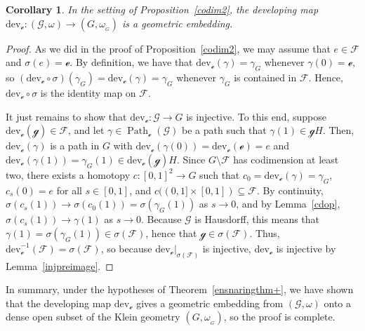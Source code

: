 \documentclass[10pt,a4paper]{amsart}
\numberwithin{equation}{section}
\newtheorem{Corollary}[Theorem]{Corollary}
\theoremstyle{definition}
\DeclareMathOperator{\Path}{Path}
\newcommand{\MC}[1]{\omega_{{}_{#1}}}
\begin{document}
\begin{Corollary}\label{codim2cor} In the setting of Proposition~{\rm \ref{codim2}}, the developing map $\mathrm{dev}_\mathscr{e}\colon (\mathscr{G},\omega)\to(G,\MC{G})$ is a geometric embedding.
\end{Corollary}
\begin{proof}As we did in the proof of Proposition~\ref{codim2}, we may assume that $e\in\mathscr{F}$ and $\sigma(e)=\mathscr{e}$. By definition, we have that $\mathrm{dev}_\mathscr{e}(\gamma)=\gamma_G$ whenever $\gamma(0)=\mathscr{e}$, so $(\mathrm{dev}_\mathscr{e}\circ\sigma)(\gamma_G)=\mathrm{dev}_\mathscr{e}(\gamma)=\gamma_G$ whenever $\gamma_G$ is contained in $\mathscr{F}$. Hence, $\mathrm{dev}_\mathscr{e}\circ\sigma$ is the identity map on $\mathscr{F}$.

It just remains to show that $\mathrm{dev}_\mathscr{e}\colon \mathscr{G}\to G$ is injective. To this end, suppose $\mathrm{dev}_\mathscr{e}(\mathscr{g})\in\mathscr{F}$, and let $\gamma\in\Path_\mathscr{e}(\mathscr{G})$ be a path such that $\gamma(1)\in\mathscr{g}H$. Then, $\mathrm{dev}_\mathscr{e}(\gamma)$ is a path in $G$ with $\mathrm{dev}_\mathscr{e}(\gamma(0))=\mathrm{dev}_\mathscr{e}(\mathscr{e})=e$ and $\mathrm{dev}_\mathscr{e}(\gamma(1))=\gamma_G(1)\in\mathrm{dev}_\mathscr{e}(\mathscr{g})H$. Since $G\setminus\mathscr{F}$ has codimension at least two, there exists a homotopy $c\colon [0,1]^2\to G$ such that $c_0=\mathrm{dev}_\mathscr{e}(\gamma)=\gamma_G$, $c_s(0)=e$ for all $s\in[0,1]$, and $c((0,1]\times[0,1])\subseteq\mathscr{F}$. By continuity, $\sigma(c_s(1))\rightarrow \sigma(c_0(1))=\sigma(\gamma_G(1))$ as $s\rightarrow 0$, and by Lemma~\ref{cdop}, $\sigma(c_s(1))\rightarrow \gamma(1)$ as $s\rightarrow 0$. Because $\mathscr{G}$ is Hausdorff, this means that $\gamma(1)=\sigma(\gamma_G(1))\in\sigma(\mathscr{F})$, hence that $\mathscr{g}\in\sigma(\mathscr{F})$. Thus, $\mathrm{dev}_\mathscr{e}^{-1}(\mathscr{F})=\sigma(\mathscr{F})$, so because $\mathrm{dev}_\mathscr{e}|_{\sigma(\mathscr{F})}$ is injective, $\mathrm{dev}_\mathscr{e}$ is injective by Lemma~\ref{injpreimage}.
\end{proof}

In summary, under the hypotheses of Theorem~\ref{ensnaringthm+}, we have shown that the developing map $\mathrm{dev}_\mathscr{e}$ gives a geometric embedding from $(\mathscr{G},\omega)$ onto a dense open subset of the Klein geometry $(G,\MC{G})$, so the proof is complete.
\end{document}
